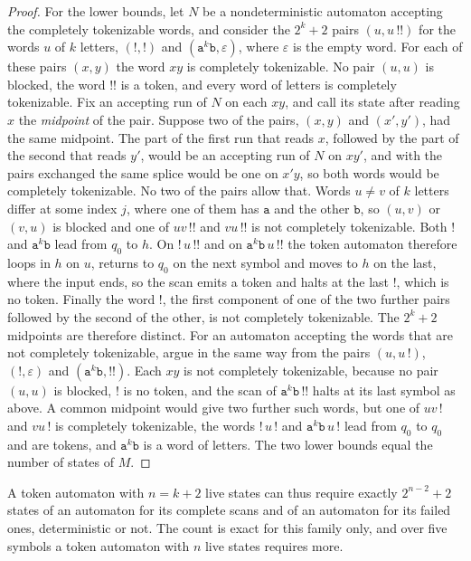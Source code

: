 \documentclass[11pt,a4paper]{article}
\theoremstyle{definition}
\theoremstyle{plain}
\newcommand{\code}[1]{\texttt{#1}}
\begin{document}
\begin{proof}
For the lower bounds, let $N$ be a nondeterministic automaton accepting the completely tokenizable words, and consider
the $2^k + 2$ pairs $(u, u\,\code{!!})$ for the words $u$ of $k$ letters, $(\code{!}, \code{!})$ and
$(\code{a}^k\code{b}, \varepsilon)$, where $\varepsilon$ is the empty word. For each of these pairs $(x, y)$ the word
$xy$ is completely tokenizable. No pair $(u, u)$ is blocked, the word $\code{!!}$ is a token, and every word of letters
is completely tokenizable. Fix an accepting run of $N$ on each $xy$, and call its state after reading $x$ the
\emph{midpoint} of the pair. Suppose two of the pairs, $(x, y)$ and $(x', y')$, had the same midpoint. The part of the
first run that reads $x$, followed by the part of the second that reads $y'$, would be an accepting run of $N$ on $xy'$,
and with the pairs exchanged the same splice would be one on $x'y$, so both words would be completely tokenizable. No
two of the pairs allow that. Words $u \neq v$ of $k$ letters differ at some index $j$, where one of them has $\code{a}$
and the other $\code{b}$, so $(u, v)$ or $(v, u)$ is blocked and one of $uv\,\code{!!}$ and $vu\,\code{!!}$ is not
completely tokenizable. Both $\code{!}$ and $\code{a}^k\code{b}$ lead from $q_0$ to $h$. On $\code{!}\,u\,\code{!!}$ and
on $\code{a}^k\code{b}\,u\,\code{!!}$ the token automaton therefore loops in $h$ on $u$, returns to $q_0$ on the next
symbol and moves to $h$ on the last, where the input ends, so the scan emits a token and halts at the last $\code{!}$,
which is no token. Finally the word $\code{!}$, the first component of one of the two further pairs followed by the
second of the other, is not completely tokenizable. The $2^k + 2$ midpoints are therefore distinct. For an automaton
accepting the words that are not completely tokenizable, argue in the same way from the pairs $(u, u\,\code{!})$,
$(\code{!}, \varepsilon)$ and $(\code{a}^k\code{b}, \code{!!})$. Each $xy$ is not completely tokenizable, because no
pair $(u, u)$ is blocked, $\code{!}$ is no token, and the scan of $\code{a}^k\code{b}\,\code{!!}$ halts at its last
symbol as above. A common midpoint would give two further such words, but one of $uv\,\code{!}$ and $vu\,\code{!}$ is
completely tokenizable, the words $\code{!}\,u\,\code{!}$ and $\code{a}^k\code{b}\,u\,\code{!}$ lead from $q_0$ to $q_0$
and are tokens, and $\code{a}^k\code{b}$ is a word of letters. The two lower bounds equal the number of states of $M$.
\end{proof}

A token automaton with $n = k + 2$ live states can thus require exactly $2^{n-2} + 2$ states of an automaton for its
complete scans and of an automaton for its failed ones, deterministic or not. The count is exact for this family only,
and over five symbols a token automaton with $n$ live states requires more.
\end{document}
